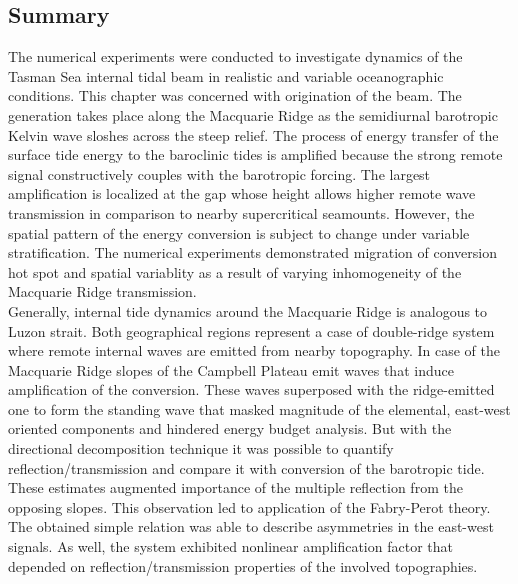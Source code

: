\documentclass[12pt]{article}
\begin{document}
\subsection{Summary}
The numerical experiments were conducted to investigate dynamics of the Tasman Sea internal tidal 
beam in realistic and variable oceanographic conditions. This chapter was concerned with 
origination of the beam. The generation takes place along the Macquarie Ridge as the semidiurnal 
barotropic Kelvin wave sloshes across the steep relief. The process of energy transfer of 
the surface tide energy to the baroclinic tides is amplified because the strong remote signal 
constructively couples with the barotropic forcing. The largest amplification is localized at the 
gap whose height allows higher remote wave transmission in comparison to nearby supercritical 
seamounts. However, the spatial pattern of the energy conversion is subject to change under 
variable stratification. The numerical experiments demonstrated migration of conversion hot 
spot and spatial variablity as a result of varying inhomogeneity of the Macquarie Ridge 
transmission.\\

Generally, internal tide dynamics around the Macquarie Ridge is analogous to Luzon strait. Both 
geographical regions represent a case of double-ridge system where remote internal waves are 
emitted from nearby topography. In case of the Macquarie Ridge slopes of the Campbell Plateau emit 
waves that induce amplification of the conversion. 
These 
waves superposed with the 
ridge-emitted one to form the standing wave that masked magnitude of the elemental, east-west 
oriented components and hindered energy budget analysis. But with the directional decomposition 
technique it was possible to quantify reflection/transmission and compare it with conversion of 
the barotropic tide. These estimates augmented importance of the multiple reflection from the 
opposing slopes. This observation led to application of the Fabry-Perot theory. The obtained simple 
relation was able to describe asymmetries in the east-west signals. As well, the system exhibited 
nonlinear amplification factor that depended on reflection/transmission properties of the involved 
topographies.\\
\end{document}

